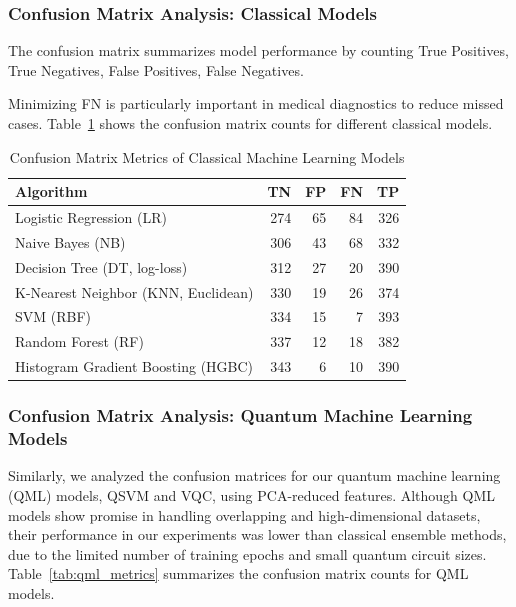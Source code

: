 \documentclass[runningheads]{llncs}
\begin{document}
\subsubsection{Confusion Matrix Analysis: Classical Models}
The confusion matrix summarizes model performance by counting 
True Positives, True Negatives, False Positives, False Negatives.

Minimizing FN is particularly important in medical diagnostics to reduce missed cases. Table~\ref{tab:algorithm_metrics} shows the confusion matrix counts for different classical models.  

\begin{table}[ht]
\centering
\caption{Confusion Matrix Metrics of Classical Machine Learning Models}
\label{tab:algorithm_metrics}
\begin{tabular}{lrrrr}
        \toprule
        \textbf{Algorithm} & \textbf{TN} & \textbf{FP} & \textbf{FN} & \textbf{TP} \\
        \midrule
        Logistic Regression (LR) & 274 & 65 & 84 & 326 \\
        Naive Bayes (NB) & 306 & 43 & 68 & 332 \\
        Decision Tree (DT, log-loss) & 312 & 27 & 20 & 390 \\
        K-Nearest Neighbor (KNN, Euclidean) & 330 & 19 & 26 & 374 \\
        SVM (RBF) & 334 & 15 & 7 & 393 \\
        Random Forest (RF) & 337 & 12 & 18 & 382 \\
        Histogram Gradient Boosting (HGBC) & 343 & 6 & 10 & 390 \\
        \bottomrule
\end{tabular}
\end{table}

\subsubsection{Confusion Matrix Analysis: Quantum Machine Learning Models}
Similarly, we analyzed the confusion matrices for our quantum machine learning (QML) models, QSVM and VQC, using PCA-reduced features. Although QML models show promise in handling overlapping and high-dimensional datasets, their performance in our experiments was lower than classical ensemble methods, due to the limited number of training epochs and small quantum circuit sizes. Table~\ref{tab:qml_metrics} summarizes the confusion matrix counts for QML models.
\end{document}
